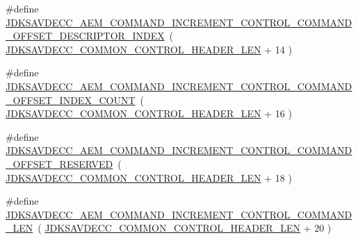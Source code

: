 \begin{DoxyCompactItemize}
\item 
\#define \hyperlink{group__command__increment__control_ga32849febcbe1ba8a6d964804c6625882}{J\+D\+K\+S\+A\+V\+D\+E\+C\+C\+\_\+\+A\+E\+M\+\_\+\+C\+O\+M\+M\+A\+N\+D\+\_\+\+I\+N\+C\+R\+E\+M\+E\+N\+T\+\_\+\+C\+O\+N\+T\+R\+O\+L\+\_\+\+C\+O\+M\+M\+A\+N\+D\+\_\+\+O\+F\+F\+S\+E\+T\+\_\+\+D\+E\+S\+C\+R\+I\+P\+T\+O\+R\+\_\+\+I\+N\+D\+EX}~( \hyperlink{group__jdksavdecc__avtp__common__control__header_gaae84052886fb1bb42f3bc5f85b741dff}{J\+D\+K\+S\+A\+V\+D\+E\+C\+C\+\_\+\+C\+O\+M\+M\+O\+N\+\_\+\+C\+O\+N\+T\+R\+O\+L\+\_\+\+H\+E\+A\+D\+E\+R\+\_\+\+L\+EN} + 14 )
\item 
\#define \hyperlink{group__command__increment__control_gaae58f12457c5a77a4aa184db5a7c6983}{J\+D\+K\+S\+A\+V\+D\+E\+C\+C\+\_\+\+A\+E\+M\+\_\+\+C\+O\+M\+M\+A\+N\+D\+\_\+\+I\+N\+C\+R\+E\+M\+E\+N\+T\+\_\+\+C\+O\+N\+T\+R\+O\+L\+\_\+\+C\+O\+M\+M\+A\+N\+D\+\_\+\+O\+F\+F\+S\+E\+T\+\_\+\+I\+N\+D\+E\+X\+\_\+\+C\+O\+U\+NT}~( \hyperlink{group__jdksavdecc__avtp__common__control__header_gaae84052886fb1bb42f3bc5f85b741dff}{J\+D\+K\+S\+A\+V\+D\+E\+C\+C\+\_\+\+C\+O\+M\+M\+O\+N\+\_\+\+C\+O\+N\+T\+R\+O\+L\+\_\+\+H\+E\+A\+D\+E\+R\+\_\+\+L\+EN} + 16 )
\item 
\#define \hyperlink{group__command__increment__control_ga469b3aef56c7b8ba6d99511968582352}{J\+D\+K\+S\+A\+V\+D\+E\+C\+C\+\_\+\+A\+E\+M\+\_\+\+C\+O\+M\+M\+A\+N\+D\+\_\+\+I\+N\+C\+R\+E\+M\+E\+N\+T\+\_\+\+C\+O\+N\+T\+R\+O\+L\+\_\+\+C\+O\+M\+M\+A\+N\+D\+\_\+\+O\+F\+F\+S\+E\+T\+\_\+\+R\+E\+S\+E\+R\+V\+ED}~( \hyperlink{group__jdksavdecc__avtp__common__control__header_gaae84052886fb1bb42f3bc5f85b741dff}{J\+D\+K\+S\+A\+V\+D\+E\+C\+C\+\_\+\+C\+O\+M\+M\+O\+N\+\_\+\+C\+O\+N\+T\+R\+O\+L\+\_\+\+H\+E\+A\+D\+E\+R\+\_\+\+L\+EN} + 18 )
\item 
\#define \hyperlink{group__command__increment__control_ga6ba675970e01a9c61fbe63e8c546fac6}{J\+D\+K\+S\+A\+V\+D\+E\+C\+C\+\_\+\+A\+E\+M\+\_\+\+C\+O\+M\+M\+A\+N\+D\+\_\+\+I\+N\+C\+R\+E\+M\+E\+N\+T\+\_\+\+C\+O\+N\+T\+R\+O\+L\+\_\+\+C\+O\+M\+M\+A\+N\+D\+\_\+\+L\+EN}~( \hyperlink{group__jdksavdecc__avtp__common__control__header_gaae84052886fb1bb42f3bc5f85b741dff}{J\+D\+K\+S\+A\+V\+D\+E\+C\+C\+\_\+\+C\+O\+M\+M\+O\+N\+\_\+\+C\+O\+N\+T\+R\+O\+L\+\_\+\+H\+E\+A\+D\+E\+R\+\_\+\+L\+EN} + 20 )
\end{DoxyCompactItemize}
